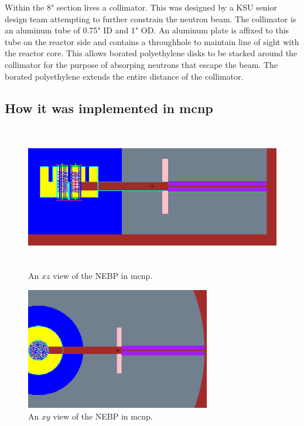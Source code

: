 Within the 8" section lives a collimator.
This was designed by a KSU senior design team attempting to further constrain the neutron beam.
The collimator is an aluminum tube of 0.75" ID and 1" OD.
An aluminum plate is affixed to this tube on the reactor side and contains a throughhole to maintain line of sight with the reactor core.
This allows borated polyethylene disks to be stacked around the collimator for the purpose of absorping neutrons that escape the beam.
The borated polyethylene extends the entire distance of the collimator. 


\subsection{How it was implemented in mcnp}

\begin{figure}[htb]
\centering
\includegraphics[height=2.5in]{tex/figures/mcnp_newxz.png}
\caption[MCNP NEBP $XZ$]{An $xz$ view of the NEBP in mcnp.}
\label{fig:mcnp_newxz}
\end{figure}

\begin{figure}[htb]
\centering
\includegraphics[trim={0 1.5in 0 1.7in}, clip, height=2.1in]{tex/figures/mcnp_newxy.png}
\caption[MCNP NEBP $XY$]{An $xy$ view of the NEBP in mcnp.}
\label{fig:mcnp_newxy}
\end{figure}


